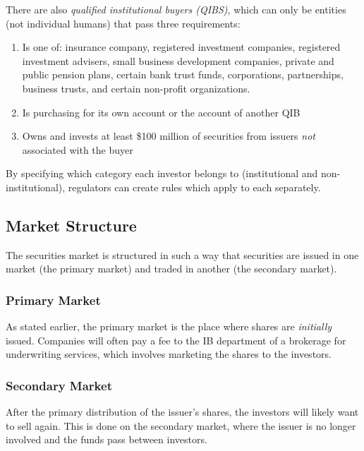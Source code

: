 There are also \textit{qualified institutional buyers (QIBS)}, which can only be entities (not individual humans) that pass three requirements:
\vspace{-1.5ex}
\begin{enumerate}[itemsep=0.4em]
  \item Is one of: insurance company, registered investment companies, registered investment advisers, small business development companies, private and public pension plans, certain bank trust funds, corporations, partnerships, business trusts, and certain non-profit organizations.
  \item Is purchasing for its own account or the account of another QIB
  \item Owns and invests at least \$100 million of securities from issuers \textit{not} associated with the buyer
\end{enumerate}

By specifying which category each investor belongs to (institutional and non-institutional), regulators can create rules which apply to each separately.

\bigskip

\subsection{Market Structure}

The securities market is structured in such a way that securities are issued in one market (the primary market) and traded in another (the secondary market). 

\medskip

\subsubsection{Primary Market}

As stated earlier, the primary market is the place where shares are \textit{initially} issued. Companies will often pay a fee to the IB department of a brokerage for underwriting services, which involves marketing the shares to the investors. 

\medskip

\subsubsection{Secondary Market}

After the primary distribution of the issuer's shares, the investors will likely want to sell again. This is done on the secondary market, where the issuer is no longer involved and the funds pass between investors. 

